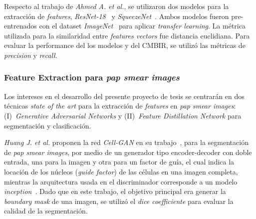 \documentclass[10pt]{article}
\begin{document}
Respecto al trabajo de \textit{Ahmed A. et al.}, se utilizaron dos modelos para la extracción de \textit{features}, \textit{ResNet-18}~\cite{7839189} y \textit{SqueezeNet}~\cite{GOPALAKRISHNAN2017322}. Ambos modelos fueron pre-entrenados con el dataset \textit{ImageNet}~\cite{5206848} para aplicar \textit{transfer learning}. La métrica utilizada para la similaridad entre \textit{features vectors} fue distancia euclidiana. Para evaluar la performance del los modelos y del CMBIR, se utilizó las métricas de \textit{precision} y \textit{recall}.


\subsubsection{Feature Extraction para \textit{pap smear images}}
Los intereses en el desarrollo del presente proyecto de tesis se centrarán en dos técnicas \textit{state of the art} para la extracción de \textit{features} en \textit{pap smear images}: (I)~\textit{Generative Adversarial Networks} y (II)~\textit{Feature Distillation Network} para segmentación y clasificación.

\textit{Huang J. et al.} proponen la red \textit{Cell-GAN} en su trabajo~\cite{9513282}, para la segmentación de \textit{pap smear images}, por medio de un generador tipo encoder-decoder con doble entrada, una para la imagen y otra para un factor de guía, el cual indica la locación de los núcleos (\textit{guide factor}) de las células en una imagen completa, mientras la arquitectura usada en el discriminador corresponde a un modelo \textit{inception}~\cite{Vincent2008}. Dado que en este trabajo, el objetivo principal era generar la \textit{boundary mask} de una imagen, se utilizó el \textit{dice coefficiente} para evaluar la calidad de la segmentación.
\end{document}

